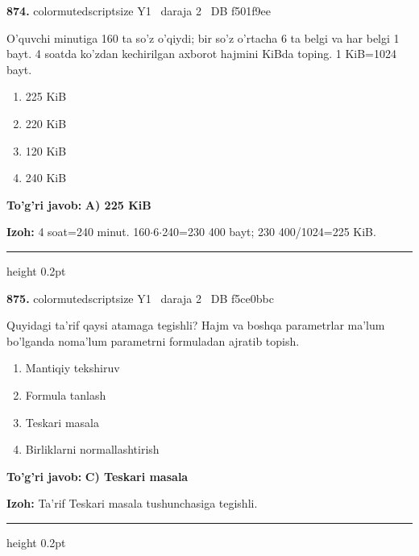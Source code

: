 \documentclass[10pt,a4paper,oneside]{article}
\begin{document}
\noindent\textbf{\color{ink}874.}  {color{muted}scriptsize Y1 \textbullet\ daraja 2 \textbullet\ DB f501f9ee}
\par
O'quvchi minutiga 160 ta so'z o'qiydi; bir so'z o'rtacha 6 ta belgi va har belgi 1 bayt. 4 soatda ko'zdan kechirilgan axborot hajmini KiBda toping. 1 KiB=1024 bayt.
\begin{enumerate}[label=\Alph*),leftmargin=9mm]
\item 225 KiB
\item 220 KiB
\item 120 KiB
\item 240 KiB
\end{enumerate}
\begin{tcolorbox}[enhanced,breakable,colback=teal!4,colframe=teal!50!black,boxrule=0.5pt,arc=1.1mm,left=3mm,right=3mm,top=1.7mm,bottom=1.7mm,before skip=2mm,after skip=2mm]
\textbf{\color{teal}To'g'ri javob:} \textbf{A) 225 KiB}
\par\smallskip
\textbf{Izoh:} 4 soat=240 minut. 160\ensuremath{\cdot}6\ensuremath{\cdot}240=230 400 bayt; 230 400/1024=225 KiB.
\end{tcolorbox}
\vspace{2mm}\hrule height 0.2pt \vspace{3mm}

\noindent\textbf{\color{ink}875.}  {color{muted}scriptsize Y1 \textbullet\ daraja 2 \textbullet\ DB f5ce0bbc}
\par
Quyidagi ta'rif qaysi atamaga tegishli? Hajm va boshqa parametrlar ma'lum bo'lganda noma'lum parametrni formuladan ajratib topish.
\begin{enumerate}[label=\Alph*),leftmargin=9mm]
\item Mantiqiy tekshiruv
\item Formula tanlash
\item Teskari masala
\item Birliklarni normallashtirish
\end{enumerate}
\begin{tcolorbox}[enhanced,breakable,colback=teal!4,colframe=teal!50!black,boxrule=0.5pt,arc=1.1mm,left=3mm,right=3mm,top=1.7mm,bottom=1.7mm,before skip=2mm,after skip=2mm]
\textbf{\color{teal}To'g'ri javob:} \textbf{C) Teskari masala}
\par\smallskip
\textbf{Izoh:} Ta'rif Teskari masala tushunchasiga tegishli.
\end{tcolorbox}
\vspace{2mm}\hrule height 0.2pt \vspace{3mm}
\end{document}
